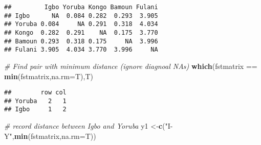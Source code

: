 \documentclass[]{article}
\newenvironment{Shaded}{\begin{snugshade}}{\end{snugshade}}
\newcommand{\KeywordTok}[1]{\textcolor[rgb]{0.13,0.29,0.53}{\textbf{{#1}}}}
\newcommand{\DataTypeTok}[1]{\textcolor[rgb]{0.13,0.29,0.53}{{#1}}}
\newcommand{\StringTok}[1]{\textcolor[rgb]{0.31,0.60,0.02}{{#1}}}
\newcommand{\CommentTok}[1]{\textcolor[rgb]{0.56,0.35,0.01}{\textit{{#1}}}}
\newcommand{\NormalTok}[1]{{#1}}
\begin{document}
\begin{verbatim}
##         Igbo Yoruba Kongo Bamoun Fulani
## Igbo      NA  0.084 0.282  0.293  3.905
## Yoruba 0.084     NA 0.291  0.318  4.034
## Kongo  0.282  0.291    NA  0.175  3.770
## Bamoun 0.293  0.318 0.175     NA  3.996
## Fulani 3.905  4.034 3.770  3.996     NA
\end{verbatim}

\begin{Shaded}
\begin{Highlighting}[]
\CommentTok{# Find pair with minimum distance (ignore diagnoal NAs)}
\KeywordTok{which}\NormalTok{(fstmatrix ==}\StringTok{ }\KeywordTok{min}\NormalTok{(fstmatrix,}\DataTypeTok{na.rm=}\NormalTok{T),T)}
\end{Highlighting}
\end{Shaded}

\begin{verbatim}
##        row col
## Yoruba   2   1
## Igbo     1   2
\end{verbatim}

\begin{Shaded}
\begin{Highlighting}[]
\CommentTok{# record distance between Igbo and Yoruba}
\NormalTok{y1 <-}\KeywordTok{c}\NormalTok{(}\StringTok{"I-Y"}\NormalTok{,}\KeywordTok{min}\NormalTok{(fstmatrix,}\DataTypeTok{na.rm=}\NormalTok{T))}
\end{Highlighting}
\end{Shaded}

\pagebreak
\end{document}
